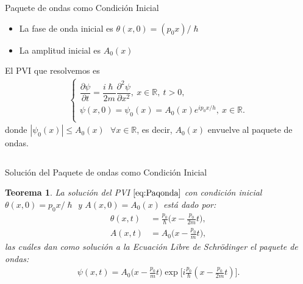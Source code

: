 \documentclass[aspectratio=1610]{beamer}
\newcommand*{\field}[1]{\mathbb{#1}}
\newtheorem*{teo}{Teorema}
\begin{document}
\begin{frame}{Paquete de ondas como Condición Inicial}
   
\begin{itemize}\itemsep1em
    \item \textcolor{}{La fase de onda inicial es $\theta(x,0) = (p_{0}x) / \hslash$}
    \item \textcolor{}{La amplitud inicial es $A_{0}(x)$}
\end{itemize} 

\vspace{0.1\textheight} 

El PVI que resolvemos es
\begin{align}
         \left\{ \begin{array}{ll}
         \dfrac{\partial\psi}{\partial t} = \dfrac{i\hslash}{2m}\dfrac{\partial^2\psi}{\partial x^2} , \:x\in\field{R}, \:t>0,\\
         \psi(x,0) = \psi_{0}(x) = A_{0}(x)e^{ip_{0}x/h}, \:x\in\field{R}. \\
         \end{array} \label{eq:Paqonda}
\right.
    \end{align}
donde $|\psi_{0}(x)|\leq A_{0}(x)\:\:\: \forall x\in\field{R}$, es decir, $A_{0}(x)$ envuelve al paquete de ondas.
    
\begin{columns}
\column{37em}
\end{columns}
\end{frame}


\begin{frame}{Solución del Paquete de ondas como Condición Inicial}
   
\begin{teo}
    La solución del PVI $\eqref{eq:Paqonda}$ con condición inicial $\theta(x,0) = p_{0}x/\hslash$ y $A(x,0) = A_{0}(x)$ está dado por:
    \begin{align*}
        \theta(x,t) & = \frac{p_{0}}{\hslash}\bigg(x - \frac{p_{0}}{2m}t\bigg),
        \\
        A(x,t) & = A_{0}\bigg(x-\frac{p_{0}}{m}t\bigg),
    \end{align*}
    las cuáles dan como solución a la Ecuación Libre de Schrödinger el paquete de ondas:
    \begin{align}
        \psi(x,t) = A_{0}\bigg(x-\frac{p_{0}}{m}t\bigg)\exp\bigg[i\frac{p_{0}}{\hslash}(x - \frac{p_{0}}{2m}t)\bigg].
        \label{eq:Apoyo7}
    \end{align}
\end{teo}
    
\begin{columns}
\column{37em}
\end{columns}
\end{frame}
\end{document}
